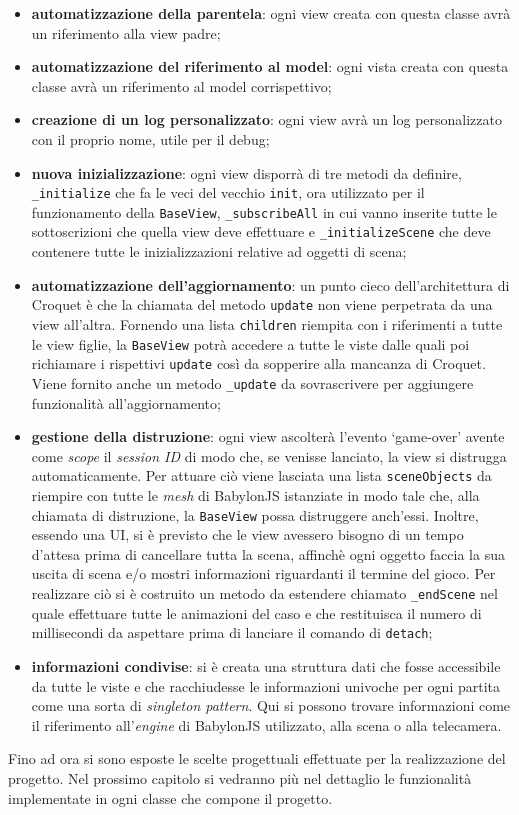 \begin{itemize}
    \item \textbf{automatizzazione della parentela}: ogni view creata con questa classe avrà un riferimento alla view padre;
    \item \textbf{automatizzazione del riferimento al model}: ogni vista creata con questa classe avrà un riferimento al model corrispettivo;
    \item \textbf{creazione di un log personalizzato}: ogni view avrà un log personalizzato con il proprio nome, utile per il debug;
    \item \textbf{nuova inizializzazione}: ogni view disporrà di tre metodi da definire, \texttt{\_initialize} che fa le veci del vecchio \texttt{init}, ora utilizzato per il funzionamento
    della \texttt{BaseView}, \texttt{\_subscribeAll} in cui vanno inserite tutte le sottoscrizioni che quella view deve effettuare e \texttt{\_initializeScene} che deve contenere tutte le
    inizializzazioni relative ad oggetti di scena;
    \item \textbf{automatizzazione dell'aggiornamento}: un punto cieco dell'architettura di Croquet è che la chiamata del metodo \texttt{update} non viene perpetrata da una view all'altra.
    Fornendo una lista \texttt{children} riempita con i riferimenti a tutte le view figlie, la \texttt{BaseView} potrà accedere a tutte le viste dalle quali poi richiamare i rispettivi
    \texttt{update} così da sopperire alla mancanza di Croquet. Viene fornito anche un metodo \texttt{\_update} da sovrascrivere per aggiungere funzionalità all'aggiornamento;
    \item \textbf{gestione della distruzione}: ogni view ascolterà l'evento `game-over' avente come \textit{scope} il \textit{session ID} di modo che, se venisse lanciato, la view
    si distrugga automaticamente. Per attuare ciò viene lasciata una lista \texttt{sceneObjects} da riempire con tutte le \textit{mesh} di BabylonJS istanziate in modo tale che,
    alla chiamata di distruzione, la \texttt{BaseView} possa distruggere anch'essi. Inoltre, essendo una UI, si è previsto che le view avessero bisogno di un tempo d'attesa prima di 
    cancellare tutta la scena, affinchè ogni oggetto faccia la sua uscita di scena e/o mostri informazioni riguardanti il termine del gioco. Per realizzare ciò si è costruito un metodo 
    da estendere chiamato \texttt{\_endScene} nel quale effettuare tutte le animazioni del caso e che restituisca il numero di millisecondi da aspettare prima di lanciare il comando di 
    \texttt{detach};
    \item \textbf{informazioni condivise}: si è creata una struttura dati che fosse accessibile da tutte le viste e che racchiudesse le informazioni univoche per ogni partita come una sorta
    di \textit{singleton pattern}. Qui si possono trovare informazioni come il riferimento all'\textit{engine} di BabylonJS utilizzato, alla scena o alla telecamera.
\end{itemize}
Fino ad ora si sono esposte le scelte progettuali effettuate per la realizzazione del progetto. Nel prossimo capitolo si vedranno più nel dettaglio le funzionalità implementate in ogni
classe che compone il progetto.